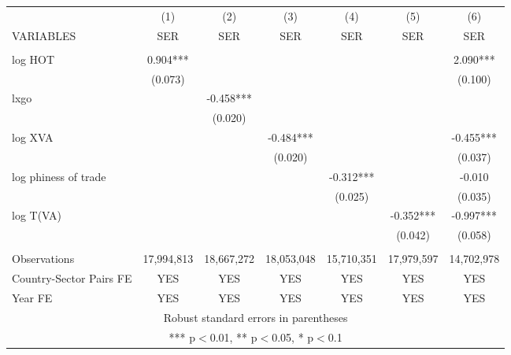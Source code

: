 \documentclass[]{article}
\begin{document}
\begin{tabular}{lcccccc} \hline
 & (1) & (2) & (3) & (4) & (5) & (6) \\
VARIABLES & SER & SER & SER & SER & SER & SER \\ \hline
 &  &  &  &  &  &  \\
log HOT & 0.904*** &  &  &  &  & 2.090*** \\
 & (0.073) &  &  &  &  & (0.100) \\
lxgo &  & -0.458*** &  &  &  &  \\
 &  & (0.020) &  &  &  &  \\
log XVA &  &  & -0.484*** &  &  & -0.455*** \\
 &  &  & (0.020) &  &  & (0.037) \\
log phiness of trade &  &  &  & -0.312*** &  & -0.010 \\
 &  &  &  & (0.025) &  & (0.035) \\
log T(VA) &  &  &  &  & -0.352*** & -0.997*** \\
 &  &  &  &  & (0.042) & (0.058) \\
 &  &  &  &  &  &  \\
Observations & 17,994,813 & 18,667,272 & 18,053,048 & 15,710,351 & 17,979,597 & 14,702,978 \\
Country-Sector Pairs FE & YES & YES & YES & YES & YES & YES \\
 Year FE & YES & YES & YES & YES & YES & YES \\ \hline
\multicolumn{7}{c}{ Robust standard errors in parentheses} \\
\multicolumn{7}{c}{ *** p$<$0.01, ** p$<$0.05, * p$<$0.1} \\
\end{tabular}
\end{document}
